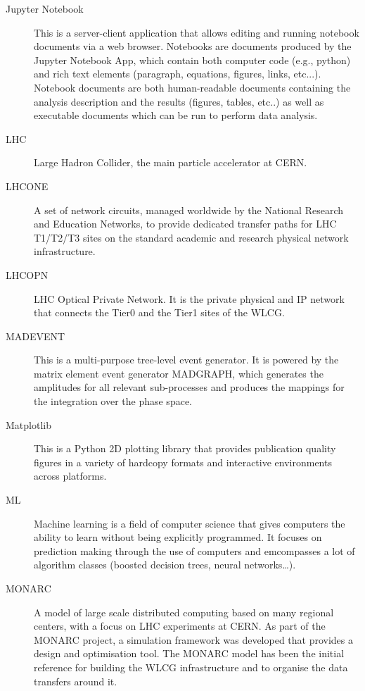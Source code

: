 \documentclass[twocolumn]{svjour3}          %
\begin{document}
\begin{appendices}
\begin{description}
\item[Jupyter Notebook] This is a server-client application that allows
editing and running notebook documents via a web browser. Notebooks are
documents produced by the Jupyter Notebook App, which contain both
computer code (e.g., python) and rich text elements (paragraph,
equations, figures, links, etc...). Notebook documents are both
human-readable documents containing the analysis description and the
results (figures, tables, etc..) as well as executable documents which
can be run to perform data analysis.

\item[LHC] Large Hadron Collider, the main particle accelerator at CERN.

\item[LHCONE] A set of network circuits, managed worldwide by the National
Research and Education Networks, to provide dedicated transfer paths for
LHC T1/T2/T3 sites on the standard academic and research physical
network infrastructure.

\item[LHCOPN] LHC Optical Private Network. It is the private physical and IP
network that connects the Tier0 and the Tier1 sites of the WLCG.

\item[MADEVENT] This is a multi-purpose tree-level event generator. It is
powered by the matrix element event generator MADGRAPH, which generates
the amplitudes for all relevant sub-processes and produces the mappings
for the integration over the phase space.

\item[Matplotlib] This is a Python 2D plotting library that provides
publication quality figures in a variety of hardcopy formats and
interactive environments across platforms.

\item[ML] Machine learning is a field of computer science that gives computers
the ability to learn without being explicitly programmed. It focuses on
prediction making through the use of computers and emcompasses a lot of
algorithm classes (boosted decision trees, neural networks\ldots{}).

\item[MONARC] A model of large scale distributed computing based on many
regional centers, with a focus on LHC experiments at CERN. As part of
the MONARC project, a simulation framework was developed that provides a
design and optimisation tool. The MONARC model has been the initial
reference for building the WLCG infrastructure and to organise the data
transfers around it.


\end{description}
\end{appendices}
\end{document}
